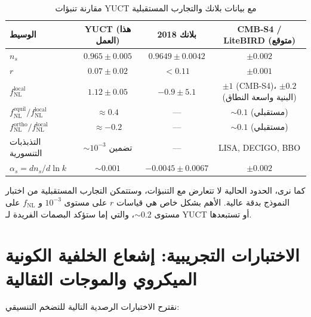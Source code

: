 \documentclass[11pt,a4paper]{article}
\theoremstyle{remark}
\newcommand{\rs}{r}
\begin{document}
	\begin{table}[htbp]
		\centering
		\caption{مقارنة تنبؤات YUCT مع بيانات بلانك والتجارب المستقبلية}
		\label{tab:comparison}
		\begin{tabular}{lccc}
			\toprule
			\textbf{الوسيط} & \textbf{YUCT (هذا العمل)} & \textbf{بلانك 2018} & \textbf{CMB‑S4 / LiteBIRD (متوقع)} \\
			\midrule
			$n_s$ & $0.965 \pm 0.005$ & $0.9649 \pm 0.0042$ & $\pm 0.002$ \\
			$\rs$ & $0.07 \pm 0.02$ & $<0.11$ & $\pm 0.001$ \\
			$f_{\mathrm{NL}}^{\mathrm{local}}$ & $1.12 \pm 0.05$ & $-0.9 \pm 5.1$ & $\pm 1$ (CMB‑S4)، $\pm 0.2$ (البنية واسعة النطاق) \\
			$f_{\mathrm{NL}}^{\mathrm{equil}} / f_{\mathrm{NL}}^{\mathrm{local}}$ & $\approx 0.4$ & — & $\sim 0.1$ (مستقبلي) \\
			$f_{\mathrm{NL}}^{\mathrm{ortho}} / f_{\mathrm{NL}}^{\mathrm{local}}$ & $\approx -0.2$ & — & $\sim 0.1$ (مستقبلي) \\
			التذبذبات التنسورية & $\sim 10^{-3}$ تضمين & — & LISA, DECIGO, BBO \\
			$\alpha_s = dn_s/d\ln k$ & $\sim 0.001$ & $-0.0045 \pm 0.0067$ & $\pm 0.002$ \\
			\bottomrule
		\end{tabular}
	\end{table}
	
	كما نرى، الحدود الحالية لا تتعارض مع التنبؤات، وستتمكن التجارب المستقبلية من اختبار النموذج بدقة عالية. الأهم بشكل خاص هي قياسات $r$ على مستوى $10^{-3}$ و $f_{\text{NL}}$ على مستوى $\sim 0.2$، والتي إما ستؤكد البصمات الفريدة لـ YUCT أو تستبعدها.
	
	\section{الاختبارات التجريبية: إشعاع الخلفية الكونية الميكروي والموجات الثقالية}
	\label{sec:tests}
	
	نقترح الاختبارات الرصدية التالية للتضخم التنسيقي:
	
\end{document}
